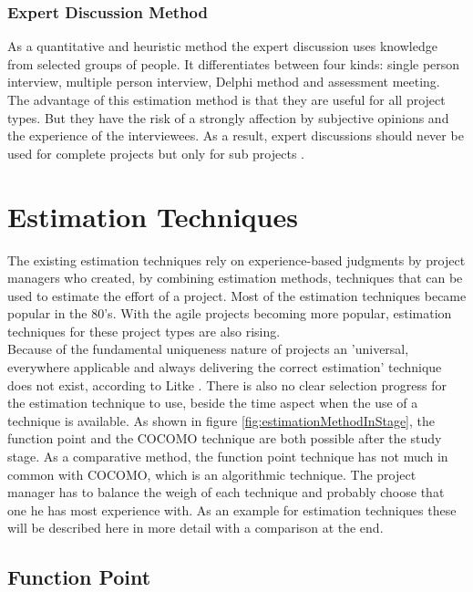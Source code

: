 \subsubsection{Expert Discussion Method}

As a quantitative and heuristic method the expert discussion uses knowledge from selected groups of people. It differentiates between four kinds: single person interview, multiple person interview, Delphi method and assessment meeting.\\
The advantage of this estimation method is that they are useful for all project types. But they have the risk of a strongly affection by subjective opinions and the experience of the interviewees. As a result, expert discussions should never be used for complete projects but only for sub projects \cite{itplanung}.\\

\section{Estimation Techniques}

The existing estimation techniques rely on experience-based judgments by project managers
who created, by combining estimation methods, techniques that can be used to estimate the effort of a project. Most of the estimation techniques became popular in the 80's. With the agile projects becoming more popular, estimation techniques for these project types are also rising. \\
Because of the fundamental uniqueness nature of projects an 'universal, everywhere applicable and always delivering the correct estimation' technique does not exist, according to Litke \cite{litke}. There is also no clear selection progress for the estimation technique to use, beside the time aspect when the use of a technique is available. As shown in figure \ref{fig:estimationMethodInStage}, the function point and the COCOMO technique are both possible after the study stage. As a comparative method, the function point technique has not much in common with COCOMO, which is an algorithmic technique. The project manager has to balance the weigh of each technique and probably choose that one he has most experience with. As an example for estimation techniques these will be described here in more detail with a comparison at the end.


\subsection{Function Point} \label{FPMethod}

